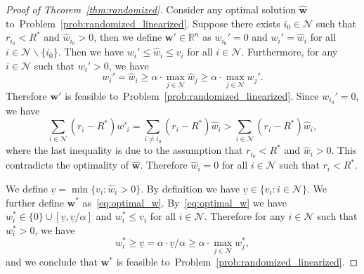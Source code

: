 \documentclass[mnsc,non-blindrev]{informs3}
\theoremstyle{definition}
\begin{document}
\begin{proof}[Proof of Theorem~\ref{thm:randomized}]
Consider any optimal solution $\hat{\bm{w}}$ to~Problem~\eqref{prob:randomized_linearized}. Suppose there exists $i_0\in\mathcal{N}$ such that $r_{i_0}<R^*$ and $\hat{w}_{i_0}>0$, then we define $\bm{w}'\in\mathbb{R}^n$ as $w_{i_0}'=0$ and $w_i'=\hat{w}_i$ for all $i\in\mathcal{N}\backslash\{i_0\}$. Then we have $w_i'\leq \hat{w}_i\leq v_i$ for all $i\in\mathcal{N}$. Furthermore, for any $i\in\mathcal{N}$ such that $w_i'>0$, we have $$w_i'=\hat{w}_i\geq \alpha\cdot\max_{j\in\mathcal{N}}\hat{w}_j\geq \alpha\cdot\max_{j\in\mathcal{N}}w_j'.$$
Therefore $\bm{w}'$ is feasible to~Problem~\eqref{prob:randomized_linearized}. Since $w_{i_0}'=0$, we have
\begin{equation*}
\sum_{i\in\mathcal{N}}(r_i-R^*)w'_i=\sum_{i\neq i_0}(r_i-R^*)\hat{w}_i>\sum_{i\in\mathcal{N}}(r_i-R^*)\hat{w}_i,
\end{equation*}
where the last inequality is due to the assumption that $r_{i_0}<R^*$ and $\hat{w}_i>0$. This contradicts the optimality of $\hat{\bm{w}}$. Therefore $\hat{w}_i=0$ for all $i\in\mathcal{N}$ such that $r_i<R^*$.

We define $\underline{v}=\min\{v_i:\hat{w}_i>0\}$. By definition we have $\underline{v}\in\{v_i:i\in\mathcal{N}\}$. We further define $\bm{w}^*$ as~\eqref{eq:optimal_w}. By~\eqref{eq:optimal_w} we have $w_i^*\in\{0\}\cup[\underline{v},\underline{v}/\alpha]$ and $w_i^*\leq v_i$ for all $i\in\mathcal{N}$. Therefore for any $i\in\mathcal{N}$ such that $w_i^*>0$, we have
\begin{equation*}
w_i^*\geq \underline{v}=\alpha\cdot\underline{v}/\alpha\geq \alpha\cdot\max_{j\in\mathcal{N}}w_j^*,
\end{equation*}
and we conclude that $\bm{w}^*$ is feasible to~Problem~\eqref{prob:randomized_linearized}. 


\end{proof}
\end{document}
